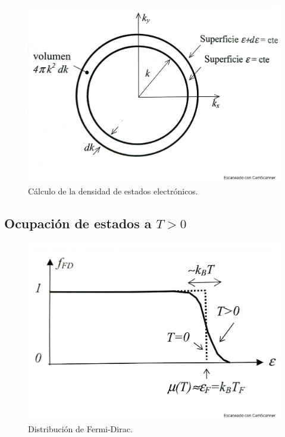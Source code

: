 \begin{figure}[h!] \centering
    \includegraphics[scale=0.5]{Cuerpo/Ch_06/Fotos libro 2.pdf}
    \caption{Cálculo de la densidad de estados electrónicos.}
    \label{Fig:06-02}
\end{figure}    



\subsection{Ocupación de estados a $T>0$}

\begin{figure}[h!] \centering
    \includegraphics[scale=0.5]{Cuerpo/Ch_06/Fotos libro 3.pdf}
    \caption{Distribución de Fermi-Dirac.}
    \label{Fig:06-03}
\end{figure}    

